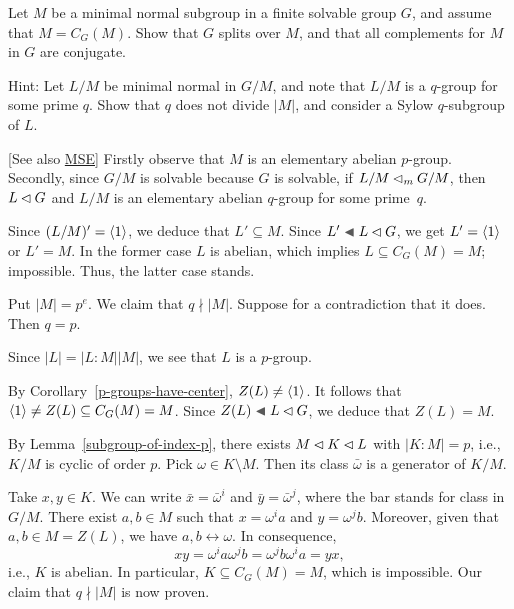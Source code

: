 \begin{probl}
    Let\/ $M$ be a minimal normal subgroup in a finite solvable group\/ $G$, and assume that\/ $M = C_G(M)$. Show that\/ $G$ splits over\/ $M$, and that all complements for\/ $M$ in\/ $G$ are conjugate.

    \textrm{\rm Hint: Let $L/M$ be minimal normal in $G/M$, and note that $L/M$ is a $q$-group for some prime $q$. Show that $q$ does not divide $|M|$, and consider a Sylow $q$-subgroup of $L$.}
\end{probl}

\begin{solution} {[See also \href{https://math.stackexchange.com/a/617987/269050}{MSE}]} Firstly observe that $M$ is an elementary abelian $p$-group. Secondly, since $G/M$ is solvable because $G$ is solvable, if $L/M\lhd_mG/M$, then $L\lhd G$ and $L/M$ is an elementary abelian $q$-group for some prime~$q$.

Since $(L/M)'=\langle1\rangle$, we deduce that $L'\subseteq M$. Since $L'\ch L\normal G$, we get $L'=\langle1\rangle$ or $L'=M$. In the former case $L$ is abelian, which implies $L\subseteq C_G(M)=M$; impossible. Thus, the latter case stands. 

Put $|M|=p^e$. We claim that $q\nmid|M|$. Suppose for a contradiction that it does. Then $q=p$.

Since $|L|=|L:M||M|$, we see that $L$ is a $p$-group.

By Corollary~\ref{p-groups-have-center}, $Z(L)\ne\langle1\rangle$. It follows that $\langle1\rangle\ne Z(L)\subseteq C_G(M)=M$. Since $Z(L)\ch L\normal G$, we deduce that $Z(L)=M$.

By Lemma~\ref{subgroup-of-index-p}, there exists $M\lhd K\lhd L$ with $|K:M|=p$, i.e., $K/M$ is cyclic of order $p$. Pick $\omega\in K\setminus M$. Then its class $\bar\omega$ is a generator of $K/M$.

Take $x,y\in K$. We can write $\bar x=\bar\omega^i$ and $\bar y=\bar\omega^j$, where the bar stands for class in $G/M$. There exist $a,b\in M$ such that $x=\omega^ia$ and $y=\omega^jb$. Moreover, given that $a,b\in M=Z(L)$, we have $a,b\leftrightarrow\omega$. In consequence,
$$
    xy=\omega^ia\omega^jb=\omega^jb\omega^ia=yx,
$$
i.e., $K$ is abelian. In particular, $K\subseteq C_G(M)=M$, which is impossible. Our claim that $q\nmid|M|$ is now proven.


\end{solution}
